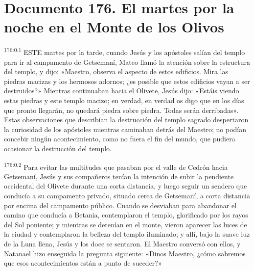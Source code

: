 \chapter{Documento 176. El martes por la noche en el Monte de los Olivos}
\par 
\textsuperscript{176:0.1} ESTE martes por la tarde, cuando Jesús y los apóstoles salían del templo para ir al campamento de Getsemaní, Mateo llamó la atención sobre la estructura del templo, y dijo: «Maestro, observa el aspecto de estos edificios. Mira las piedras macizas y los hermosos adornos; ¿es posible que estos edificios vayan a ser destruidos?» Mientras continuaban hacia el Olivete, Jesús dijo: «Estáis viendo estas piedras y este templo macizo; en verdad, en verdad os digo que en los días que pronto llegarán, no quedará piedra sobre piedra. Todas serán derribadas». Estas observaciones que describían la destrucción del templo sagrado despertaron la curiosidad de los apóstoles mientras caminaban detrás del Maestro; no podían concebir ningún acontecimiento, como no fuera el fin del mundo, que pudiera ocasionar la destrucción del templo.

\par 
\textsuperscript{176:0.2} Para evitar las multitudes que pasaban por el valle de Cedrón hacia Getsemaní, Jesús y sus compañeros tenían la intención de subir la pendiente occidental del Olivete durante una corta distancia, y luego seguir un sendero que conducía a su campamento privado, situado cerca de Getsemaní, a corta distancia por encima del campamento público. Cuando se desviaban para abandonar el camino que conducía a Betania, contemplaron el templo, glorificado por los rayos del Sol poniente; y mientras se detenían en el monte, vieron aparecer las luces de la ciudad y contemplaron la belleza del templo iluminado; y allí, bajo la suave luz de la Luna llena, Jesús y los doce se sentaron. El Maestro conversó con ellos, y Natanael hizo enseguida la pregunta siguiente: «Dinos Maestro, ¿cómo sabremos que esos acontecimientos están a punto de suceder?»

